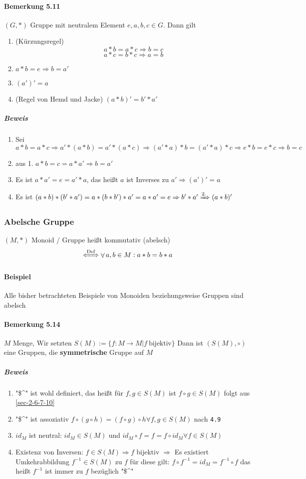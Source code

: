 \documentclass[a4paper]{scrartcl}
\DeclareMathOperator{\Forall}{\forall}
\theoremstyle{definition}
\theoremstyle{plain}
\theoremstyle{plain}
\theoremstyle{remark}
\theoremstyle{remark}
\theoremstyle{remark}
\begin{document}
\paragraph{Bemerkung 5.11}
\label{sec-3-1-4-2}
$(G,*)$ Gruppe mit neutralem Element $e,a,b,c \in G$. Dann gilt
\begin{enumerate}
\item (Kürzungsregel) \[a*b = a*c \Rightarrow b = c\] \[a*c = b * c \Rightarrow a = b\]
\item $a*b = e \Rightarrow b = a'$
\item $(a')' = a$
\item (Regel von Hemd und Jacke) $(a*b)' = b' * a'$
\end{enumerate}
\subparagraph{Beweis}
\label{sec-3-1-4-2-1}
\begin{enumerate}
\item Sei $a * b = a * c \Rightarrow a'*(a*b) = a'*(a*c) \Rightarrow (a'*a)*b=(a'*a)*c \Rightarrow e*b = e*c \Rightarrow b = c$
\item aus 1. $a*b = c = a*a' \Rightarrow b = a'$
\item Es ist $a*a' = e = a' * a$, das heißt $a$ ist Inverses zu $a' \Rightarrow (a')' = a$
\item Es ist $(a*b)*(b'*a') = a*(b*b')*a' = a*a' = e \Rightarrow b' * a' \xRightarrow{\text{2.}} (a *b)'$
\end{enumerate}
\subsubsection{Abelsche Gruppe}
\label{sec-3-1-5}
$(M,*)$ Monoid / Gruppe heißt kommutativ (abelsch)
\[\xLeftrightarrow{\text{Def}} \Forall a,b\in M: a*b = b*a\]
\paragraph{Beispiel}
\label{sec-3-1-5-1}
Alle bisher betrachteten Beispiele von Monoiden beziehungsweise Gruppen sind abelsch
\paragraph{Bemerkung 5.14}
\label{sec-3-1-5-2}
$M$ Menge, Wir setzten $S(M):= \{f:M\to M | f~\text{bijektiv}\}$
Dann ist $(S(M),\circ)$ eine Gruppen, die \textbf{symmetrische} Gruppe auf $M$
\subparagraph{Beweis}
\label{sec-3-1-5-2-1}
\begin{enumerate}
\item "\$\^{}" ist wohl definiert, das heißt für $f,g\in S(M)$ ist $f\circ g \in S(M)$ folgt aus \ref{sec-2-6-7-10}
\item "\$\^{}" ist assoziativ $f\circ(g\circ h) = (f\circ g) \circ h \Forall f,g\in S(M)$ nach \texttt{4.9}
\item $id_M$ ist neutral: $id_M \in S(M)$ und $id_M\circ f = f = f\circ id_M \Forall f\in S(M)$
\item Existenz von Inversen: $f\in S(M) \Rightarrow f$ bijektiv $\Rightarrow$ Es existiert Umkehrabbildung $f^{-1}\in S(M)$ zu $f$
         für diese gilt: $f\circ f^{-1} = id_M = f^{-1}\circ f$ das heißt $f^{-1}$ ist immer zu $f$ bezüglich "\$\^{}"
\end{enumerate}
\end{document}
